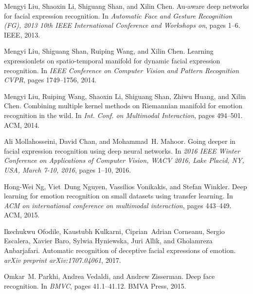 \documentclass{bmvc2k}
\begin{document}
\begin{thebibliography}{29}
Mengyi Liu, Shaoxin Li, Shiguang Shan, and Xilin Chen.
\newblock Au-aware deep networks for facial expression recognition.
\newblock In \emph{Automatic Face and Gesture Recognition (FG), 2013 10th IEEE
  International Conference and Workshops on}, pages 1--6. IEEE, 2013.

Mengyi Liu, Shiguang Shan, Ruiping Wang, and Xilin Chen.
\newblock Learning expressionlets on spatio-temporal manifold for dynamic
  facial expression recognition.
\newblock In \emph{IEEE Conference on Computer Vision and Pattern Recognition
  {CVPR}}, pages 1749--1756, 2014{}.

Mengyi Liu, Ruiping Wang, Shaoxin Li, Shiguang Shan, Zhiwu Huang, and Xilin
  Chen.
\newblock Combining multiple kernel methods on {Riemannian} manifold for
  emotion recognition in the wild.
\newblock In \emph{Int. Conf. on Multimodal Interaction}, pages 494--501. ACM,
  2014{}.

Ali Mollahosseini, David Chan, and Mohammad~H. Mahoor.
\newblock Going deeper in facial expression recognition using deep neural
  networks.
\newblock In \emph{2016 {IEEE} Winter Conference on Applications of Computer
  Vision, {WACV} 2016, Lake Placid, NY, USA, March 7-10, 2016}, pages 1--10,
  2016.

Hong-Wei Ng, Viet~Dung Nguyen, Vassilios Vonikakis, and Stefan Winkler.
\newblock Deep learning for emotion recognition on small datasets using
  transfer learning.
\newblock In \emph{ACM on international conference on multimodal interaction},
  pages 443--449. ACM, 2015.

Ikechukwu Ofodile, Kaustubh Kulkarni, Ciprian~Adrian Corneanu, Sergio Escalera,
  Xavier Baro, Sylwia Hyniewska, Juri Allik, and Gholamreza Anbarjafari.
\newblock Automatic recognition of deceptive facial expressions of emotion.
\newblock \emph{arXiv preprint arXiv:1707.04061}, 2017.

Omkar~M. Parkhi, Andrea Vedaldi, and Andrew Zisserman.
\newblock Deep face recognition.
\newblock In \emph{{BMVC}}, pages 41.1--41.12. {BMVA} Press, 2015.


\end{thebibliography}
\end{document}
